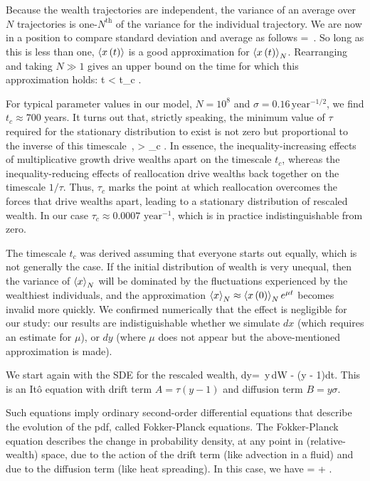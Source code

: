Because the wealth trajectories are independent, the variance of an average over $N$ trajectories is one-$N^{\text{th}}$ of the variance for the individual trajectory.  
We are now in a position to compare standard deviation and average as follows
\be
{} = \,.
\ee
So long as this is less than one, $\left\langle x\left(t\right) \right\rangle$ is a good approximation for $\left\langle x\left(t\right) \right\rangle_N$. Rearranging and taking $N\gg1$ gives an upper bound on the time for which this approximation holds:
\be
t < t_c \equiv {}.
\ee

For typical parameter values in our model, $N=10^8$ and $\sigma=0.16\, \text{year}^{-1/2}$, we find $t_c\approx 700$ years. It turns out that, strictly speaking, the minimum value of $\tau$ required for the stationary distribution to exist is not zero but proportional to the inverse of this timescale~\cite{Bouchaud2015b}, \ie 
\be
\tau > \tau_c \equiv {}.
\ee
In essence, the inequality-increasing effects of multiplicative growth drive wealths apart on the timescale $t_c$, whereas the inequality-reducing effects of reallocation drive wealths back together on the timescale $1/\tau$. Thus, $\tau_c$ marks the point at which reallocation overcomes the forces that drive wealths apart, leading to a stationary distribution of rescaled wealth. In our case $\tau_c\approx 0.0007 \text{ year}^{-1}$, which is in practice indistinguishable from zero.

The timescale $t_c$ was derived assuming that everyone starts out equally, which is not generally the case. If the initial distribution of wealth is very unequal, then the variance of $\left\langle x \right\rangle_N$ will be dominated by the fluctuations experienced by the wealthiest individuals, and the approximation $\left\langle x \right\rangle_N\approx \left\langle x\left(0\right) \right\rangle_N e^{\mu t}$ becomes invalid more quickly. We confirmed numerically that the effect is negligible for our study: our results are indistiguishable whether we simulate $dx$ (which requires an estimate for $\mu$), or $dy$ (where $\mu$ does not appear but the above-mentioned approximation is made).


We start again with the SDE for the rescaled wealth, 
\be
dy= \sigma\,y\,dW - \tau\left(y - 1\right)dt.
\ee
This is an It\^o equation with drift term 
$A=\tau(y - 1)$ and diffusion term $B=y \sigma$.

Such equations imply ordinary second-order differential equations that describe the evolution of the pdf, called Fokker-Planck equations. 
The Fokker-Planck equation describes the change in probability density, at any point in (relative-wealth) space, due to the action of the drift term (like advection in a fluid) and due to the diffusion term (like heat spreading). In this case, we have
\be
{}= + .
\ee

